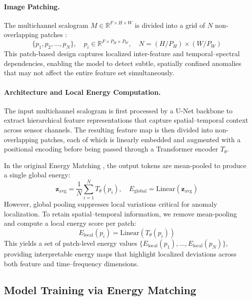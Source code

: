 \documentclass{article}
\begin{document}
\paragraph{Image Patching.}

The multichannel scalogram $M \in \mathbb{R}^{F \times H \times W}$ is divided into a grid of $N$ non-overlapping patches \citep{dosovitskiy_beyer_kolesnikov_weissenborn_zhai_unterthiner_dehghani_minderer_heigold_gelly_2021}:
\[
 \{p_1, p_2, \dots, p_N\}, \quad p_i \in \mathbb{R}^{F \times P_H \times P_W}, \quad N = (H / P_H) \times (W / P_W) \]
This patch-based design captures localized inter-feature and temporal–spectral dependencies, enabling the model to detect subtle, spatially confined anomalies that may not affect the entire feature set simultaneously.

\paragraph{Architecture and Local Energy Computation.}

The input multichannel scalogram is first processed by a U-Net backbone to extract hierarchical feature representations that capture spatial–temporal context across sensor channels. 
The resulting feature map is then divided into non-overlapping patches, each of which is linearly embedded and augmented with a positional encoding before being passed through a Transformer encoder $T_\theta$.

In the original Energy Matching \citep{balcerak2025energymatchingunifyingflow}, the output tokens are mean-pooled to produce a single global energy:
\[
\mathbf{z}_{\text{avg}} = \frac{1}{N} \sum_{i=1}^{N} T_\theta(p_i), \quad
E_{\text{global}} = \text{Linear}(\mathbf{z}_{\text{avg}})
\]
However, global pooling suppresses local variations critical for anomaly localization.
To retain spatial–temporal information, we remove mean-pooling and compute a local energy score per patch:\label{sec:local_energy}
\[
E_{\text{local}}(p_i) = \text{Linear}(T_\theta(p_i))
\]
This yields a set of patch-level energy values 
$\{E_{\text{local}}(p_1), \dots, E_{\text{local}}(p_N)\}$, 
providing interpretable energy maps that highlight localized deviations across both feature and time–frequency dimensions.

\subsection{Model Training via Energy Matching}
\end{document}
